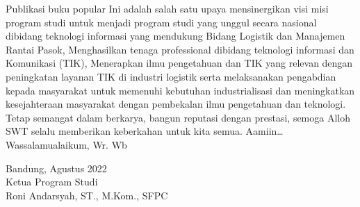 Publikasi buku popular Ini adalah salah satu upaya mensinergikan visi misi program studi untuk menjadi program studi yang unggul secara nasional dibidang teknologi informasi yang mendukung Bidang Logistik dan Manajemen Rantai Pasok, Menghasilkan tenaga professional dibidang teknologi informasi dan Komunikasi (TIK), Menerapkan ilmu pengetahuan dan TIK yang relevan dengan peningkatan layanan TIK di industri logistik serta melaksanakan pengabdian kepada masyarakat untuk memenuhi kebutuhan industrialisasi dan meningkatkan kesejahteraan masyarakat dengan pembekalan ilmu pengetahuan dan teknologi.\\

Tetap semangat dalam berkarya, bangun reputasi dengan prestasi, semoga Alloh SWT selalu memberikan keberkahan untuk kita semua. Aamiin…\\
Wassalamualaikum, Wr. Wb

\begin{flushleft}
Bandung, Agustus 2022\\
Ketua Program Studi\\
Roni Andarsyah, ST., M.Kom., SFPC\\[1cm]
\end{flushleft}